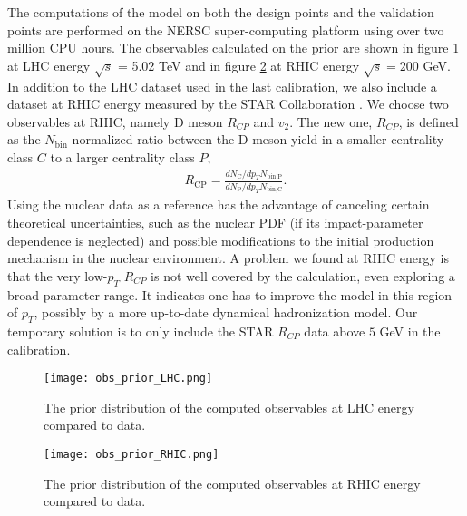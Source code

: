 The computations of the model on both the design points and the validation points are performed on the NERSC super-computing platform using over two million CPU hours.
The observables calculated on the prior are shown in figure \ref{fig:new:obs_prior_LHC} at LHC energy $\sqrt{s}$ = 5.02 TeV and in figure \ref{fig:new:obs_prior_RHIC} at RHIC energy $\sqrt{s} = 200$ GeV.
In addition to the LHC dataset used in the last calibration, we also include a dataset at RHIC energy measured by the STAR Collaboration \cite{Adamczyk:2017xur,Adam:2018inb}.
We choose two observables at RHIC, namely D meson $R_{CP}$ and $v_2$. 
The new one, $R_{CP}$, is defined as the $N_{\textrm{bin}}$ normalized ratio between the D meson yield in a smaller centrality class $C$ to a larger centrality class $P$,
\begin{eqnarray}
R_{\textrm{CP}} = \frac{dN_\textrm{C}/dp_T N_{\textrm{bin,P}}}{dN_\textrm{P}/dp_T N_{\textrm{bin,C}}}.
\end{eqnarray}
Using the nuclear data as a reference has the advantage of canceling certain theoretical uncertainties, such as the nuclear PDF (if its impact-parameter dependence is neglected) and possible modifications to the initial production mechanism in the nuclear environment.
A problem we found at RHIC energy is that the very low-$p_T$ $R_{CP}$ is not well covered by the calculation, even exploring a broad parameter range.
It indicates one has to improve the model in this region of $p_T$, possibly by a more up-to-date dynamical hadronization model.
Our temporary solution is to only include the STAR $R_{CP}$ data above $5$ GeV in the calibration.

\begin{figure}
\singlespacing
\centering
\texttt{[image: obs\_prior\_LHC.png]}
\caption[The prior distribution of the calculated observables at LHC]{The prior distribution of the computed observables at LHC energy compared to data.}
\label{fig:new:obs_prior_LHC}
\end{figure}

\begin{figure}
\singlespacing
\centering
\texttt{[image: obs\_prior\_RHIC.png]}
\caption[The prior distribution of the calculated observables at RHIC]{The prior distribution of the computed observables at RHIC energy compared to data.}
\label{fig:new:obs_prior_RHIC}
\end{figure}

